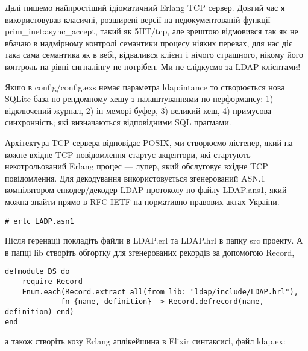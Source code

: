 Далі пишемо найпростіший ідіоматичний Erlang TCP сервер. Довгий час я використовував класичні, розширені версії на недокументованій функції prim_inet:async_accept, такий як 5HT/tcp, але зрештою відмовився так як не вбачаю в надмірному контролі семантики процесу ніяких перевах, для нас діє така сама семантика як в вебі, відвалився клієнт і нічого страшного, нікому його контроль на рівні сигналінгу не потрібен. Ми не слідкуємо за LDAP клієнтами!

Якшо в config/config.exs немає параметра ldap:intance то створюється нова SQLite база по рендомному хешу з налаштуваннями по перформансу: 1) відключений журнал, 2) ін-меморі буфер, 3) великий кеш, 4) примусова синхронність; які визначаються відповідними SQL прагмами.

Архітектура TCP сервера відповідає POSIX, ми створюємо лістенер, який на кожне вхідне TCP повідомлення стартує акцептори, які стартують некотрольований Erlang процес — лупер, який обслуговує вхідне TCP повідомлення. Для декодування використовується згенерований ASN.1 компілятором енкодер/декодер LDAP протоколу по файлу LDAP.ans1, який можна знайти прямо в RFC IETF на нормативно-правових актах України.

\begin{lstlisting}
# erlc LADP.asn1
\end{lstlisting}

Після геренації покладіть файли в LDAP.erl та LDAP.hrl в папку src проекту. А в папці lib створіть обгортку для згенерованих рекордів за допомогою Record,

\begin{lstlisting}
defmodule DS do
    require Record
    Enum.each(Record.extract_all(from_lib: "ldap/include/LDAP.hrl"),
             fn {name, definition} -> Record.defrecord(name, definition) end)
end
\end{lstlisting}

а також створіть козу Erlang аплікейшина в Elixir синтаксисі, файл ldap.ex:

